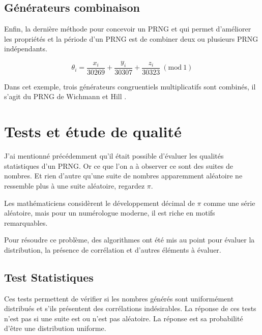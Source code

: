 \documentclass[9pt,a4paper,twoside,english]{class/backend}
\begin{document}
    \subsection{Générateurs combinaison}\smallskip

    \hspace{10pt}Enfin, la dernière méthode pour concevoir un PRNG et qui permet d'améliorer les propriétés et la période d'un PRNG est de combiner deux ou plusieurs PRNG indépendants.
        
        \begin{equation}
            \theta_i = \frac{x_i}{30 269} + \frac{y_i}{30 307} + \frac{z_i}{30 323} \ (\text{mod} \ 1)
        \end{equation}
    
    Dans cet exemple, trois générateurs congruentiels multiplicatifs sont combinés, il s'agit du PRNG de Wichmann et Hill \cite{WichmannHill}.
    


\section{Tests et étude de qualité}\smallskip

    \hspace{10pt}J'ai mentionné précédemment qu'il était possible d'évaluer les qualités statistiques d'un PRNG. Or ce que l'on a à observer ce sont des suites de nombres. Et rien d'autre qu'une suite de nombres apparemment aléatoire ne ressemble plus à une suite aléatoire, regardez $\pi$.

    \begin{rhoenv}[frametitle = {\textit{Scientific American}, \citetitle{refPI}, Martin Gardner, 1965}]
        Les mathématiciens considèrent le développement décimal de $\pi$ comme une série aléatoire, mais pour un numérologue moderne, il est riche en motifs remarquables.
    \end{rhoenv}

    Pour résoudre ce problème, des algorithmes ont été mis au point pour évaluer la distribution, la présence de corrélation et d'autres éléments à évaluer.

    \subsection{Test Statistiques}\smallskip

    \hspace{10pt}Ces tests permettent de vérifier si les nombres générés sont uniformément distribués et s'ils présentent des corrélations indésirables. La réponse de ces tests n'est pas si une suite est ou n'est pas aléatoire. La réponse est sa probabilité d'être une distribution uniforme.
\end{document}
